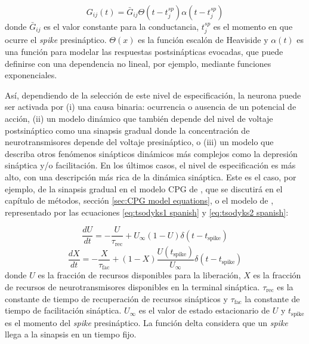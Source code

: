 \begin{equation}
	G_{ij}(t) = \bar{G}_{ij}  \Theta(t-t_j^{sp}) \alpha (t-t_j^{sp})
	\label{eq: Gii spanish}
\end{equation}
\noindent donde $\bar{G}_{ij}$ es el valor constante para la conductancia, $t_j^{sp}$ es el momento en que ocurre el \textit{spike} presináptico. $\Theta(x)$ es la función escalón de Heaviside y $\alpha(t)$ es una función para modelar las respuestas postsinápticas evocadas, que puede definirse con una dependencia no lineal, por ejemplo, mediante funciones exponenciales.

Así, dependiendo de la selección de este nivel de especificación, la neurona puede ser activada por (i) una causa binaria: ocurrencia o ausencia de un potencial de acción, (ii) un modelo dinámico que también depende del nivel de voltaje postsináptico como una sinapsis gradual donde la concentración de neurotransmisores depende del voltaje presináptico, o (iii) un modelo que describa otros fenómenos sinápticos dinámicos más complejos como la depresión sináptica y/o facilitación. En los últimos casos, el nivel de especificación es más alto, con una descripción más rica de la dinámica sináptica. Este es el caso, por ejemplo, de la sinapsis gradual en el modelo CPG de \textcite{vavoulis_dynamic_2007}, que se discutirá en el capítulo de métodos, sección \ref{sec:CPG model equations}, o el modelo de \textcite{tsodyks_neural_1997}, representado por las ecuaciones \ref{eq:tsodyks1 spanish} y \ref{eq:tsodyks2 spanish}:

\begin{equation}
	\frac{dU}{dt} = -\frac{U}{\tau_{\text{rec}}} + U_{\infty}(1 - U) \delta(t - t_{\text{spike}})
	\label{eq:tsodyks1 spanish}
\end{equation}
\begin{equation}
	\frac{dX}{dt} = -\frac{X}{\tau_{\text{fac}}} + (1 - X) \frac{U(t_{\text{spike}})}{U_{\infty}} \delta(t - t_{\text{spike}})
	\label{eq:tsodyks2 spanish}
\end{equation}
\noindent donde $U$ es la fracción de recursos disponibles para la liberación, $X$ es la fracción de recursos de neurotransmisores disponibles en la terminal sináptica. $\tau_\text{rec}$ es la constante de tiempo de recuperación de recursos sinápticos y $\tau_\text{fac}$ la constante de tiempo de facilitación sináptica. $U_\infty$ es el valor de estado estacionario de $U$ y $t_{\text{spike}}$ es el momento del \textit{spike} presináptico. La función delta considera que un \textit{spike} llega a la sinapsis en un tiempo fijo.


